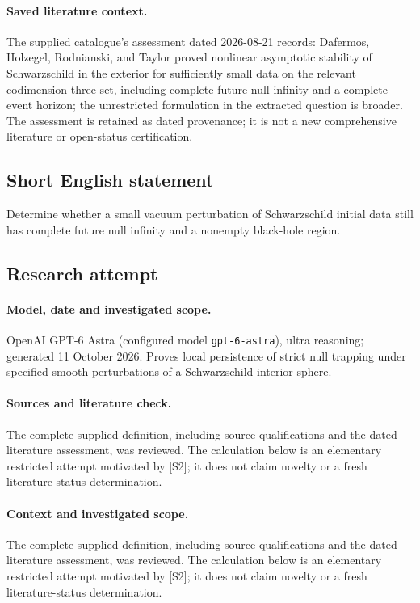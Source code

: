 \documentclass[11pt]{article}
\begin{document}
\paragraph{Saved literature context.} The supplied catalogue's assessment dated 2026-08-21 records: Dafermos, Holzegel, Rodnianski, and Taylor proved nonlinear asymptotic stability of Schwarzschild in the exterior for sufficiently small data on the relevant codimension-three set, including complete future null infinity and a complete event horizon; the unrestricted formulation in the extracted question is broader. The assessment is retained as dated provenance; it is not a new comprehensive literature or open-status certification.
\subsection{Short English statement}
Determine whether a small vacuum perturbation of Schwarzschild initial data still has complete future null infinity and a nonempty black-hole region.
\subsection{Research attempt}
\paragraph{Model, date and investigated scope.}
OpenAI GPT-6 Astra (configured model \texttt{gpt-6-astra}), ultra reasoning; generated 11 October 2026. Proves local persistence of strict null trapping under specified smooth perturbations of a Schwarzschild interior sphere.

\paragraph{Sources and literature check.}
The complete supplied definition, including source qualifications and the dated literature assessment, was reviewed. The calculation below is an elementary restricted attempt motivated by [S2]; it does not claim novelty or a fresh literature-status determination.

\paragraph{Context and investigated scope.} The complete supplied definition, including source qualifications and the dated literature assessment, was reviewed. The calculation below is an elementary restricted attempt motivated by [S2]; it does not claim novelty or a fresh literature-status determination.
\end{document}
